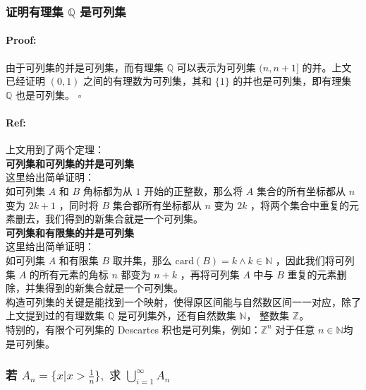 \documentclass{article}
\begin{document}
\subsubsection{证明有理集 $\mathbb{Q}$ 是可列集}
\paragraph{Proof:}
由于可列集的并是可列集，而有理集 $\mathbb{Q}$ 可以表示为可列集 $(n, n + 1]$ 的并。上文已经证明 $(0, 1)$ 之间的有理数为可列集，其和 $\{1\}$ 的并也是可列集，即有理集 $\mathbb{Q}$ 也是可列集。 $\square$
\paragraph{Ref:}
上文用到了两个定理：\\
\textbf{可列集和可列集的并是可列集}\\
这里给出简单证明：\\
如可列集 $A$ 和 $B$ 角标都为从 $1$ 开始的正整数，那么将 $A$ 集合的所有坐标都从 $n$ 变为 $2k + 1$ ，同时将 $B$ 集合都所有坐标都从 $n$ 变为 $2k$ ，将两个集合中重复的元素删去，我们得到的新集合就是一个可列集。\\
\textbf{可列集和有限集的并是可列集}\\
这里给出简单证明：\\
如可列集 $A$ 和有限集 $B$ 取并集，那么 $\text{card}(B) = k \land k \in \mathbb{N}$ ，因此我们将可列集 $A$ 的所有元素的角标 $n$ 都变为 $n + k$ ，再将可列集 $A$ 中与 $B$ 重复的元素删除，并集得到的新集合就是一个可列集。\\
构造可列集的关键是能找到一个映射，使得原区间能与自然数区间一一对应，除了上文提到过的有理数集 $\mathbb{Q}$ 是可列集外，还有自然数集 $\mathbb{N}$， 整数集 $\mathbb{Z}$。\\
特别的，有限个可列集的 Descartes 积也是可列集，例如：$\mathbb{Z}^n$ 对于任意 $n \in \mathbb{N}$均是可列集。

\subsubsection{若 $A_{n} = \{x | x > \frac{1}{n}\}, \text{ 求 } \bigcup_{i = 1}^{\infty} A_n$}
\end{document}
